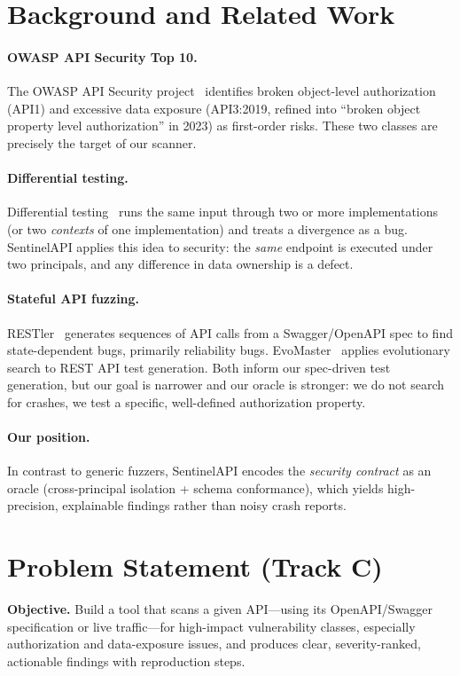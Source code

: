 \documentclass[11pt]{article}
\begin{document}
\section{Background and Related Work}
\paragraph{OWASP API Security Top 10.}
The OWASP API Security project~\cite{owasp} identifies broken object-level authorization
(API1) and excessive data exposure (API3:2019, refined into ``broken object property level
authorization'' in 2023) as first-order risks. These two classes are precisely the target
of our scanner.

\paragraph{Differential testing.}
Differential testing~\cite{mckeeman} runs the same input through two or more
implementations (or two \emph{contexts} of one implementation) and treats a divergence as
a bug. SentinelAPI applies this idea to security: the \emph{same} endpoint is executed under
two principals, and any difference in data ownership is a defect.

\paragraph{Stateful API fuzzing.}
RESTler~\cite{restler} generates sequences of API calls from a Swagger/OpenAPI spec to find
state-dependent bugs, primarily reliability bugs. EvoMaster~\cite{evomaster} applies
evolutionary search to REST API test generation. Both inform our spec-driven test
generation, but our goal is narrower and our oracle is stronger: we do not search for
crashes, we test a specific, well-defined authorization property.

\paragraph{Our position.}
In contrast to generic fuzzers, SentinelAPI encodes the \emph{security contract} as an
oracle (cross-principal isolation + schema conformance), which yields high-precision,
explainable findings rather than noisy crash reports.

\section{Problem Statement (Track C)}
\textbf{Objective.} Build a tool that scans a given API---using its OpenAPI/Swagger
specification or live traffic---for high-impact vulnerability classes, especially
authorization and data-exposure issues, and produces clear, severity-ranked, actionable
findings with reproduction steps.
\end{document}

